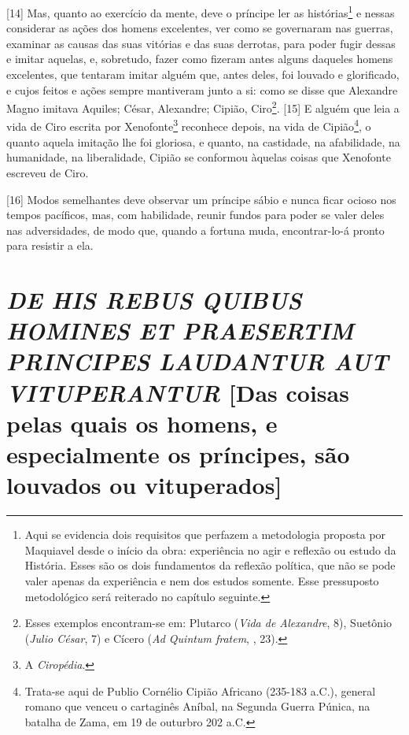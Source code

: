 {[}14{]} Mas, quanto ao exercício da mente, deve o príncipe ler as
histórias\footnote{Aqui se evidencia dois requisitos que perfazem a
  metodologia proposta por Maquiavel desde o início da obra: experiência
  no agir e reflexão ou estudo da História. Esses são os dois
  fundamentos da reflexão política, que não se pode valer apenas da
  experiência e nem dos estudos somente. Esse pressuposto metodológico
  será reiterado no capítulo seguinte.} e nessas considerar as ações dos
homens excelentes, ver como se governaram nas guerras, examinar as
causas das suas vitórias e das suas derrotas, para poder fugir dessas e
imitar aquelas, e, sobretudo, fazer como fizeram antes alguns daqueles
homens excelentes, que tentaram imitar alguém que, antes deles, foi
louvado e glorificado, e cujos feitos e ações sempre mantiveram junto a
si: como se disse que Alexandre Magno imitava Aquiles; César, Alexandre;
Cipião, Ciro\footnote{Esses exemplos encontram-se em: Plutarco
  (\emph{Vida de Alexandre}, 8), Suetônio (\emph{Julio César}, 7) e
  Cícero (\emph{Ad Quintum fratem}, , 23).}. {[}15{]} E alguém que leia
a vida de Ciro escrita por Xenofonte\footnote{A \emph{Ciropédia}.}
reconhece depois, na vida de Cipião\footnote{Trata-se aqui de Publio
  Cornélio Cipião Africano (235-183 a.C.), general romano que venceu o
  cartaginês Aníbal, na Segunda Guerra Púnica, na batalha de Zama, em 19
  de outurbro 202 a.C.}, o quanto aquela imitação lhe foi gloriosa, e
quanto, na castidade, na afabilidade, na humanidade, na liberalidade,
Cipião se conformou àquelas coisas que Xenofonte escreveu de Ciro.

{[}16{]} Modos semelhantes deve observar um príncipe sábio e nunca ficar
ocioso nos tempos pacíficos, mas, com habilidade, reunir fundos para
poder se valer deles nas adversidades, de modo que, quando a fortuna
muda, encontrar-lo-á pronto para resistir a ela.

\quebra\section{\emph{DE HIS REBUS QUIBUS HOMINES ET PRAESERTIM PRINCIPES LAUDANTUR AUT~
VITUPERANTUR}\break
{[}Das coisas pelas quais os homens, e especialmente os príncipes, são
louvados ou vituperados{]}}

